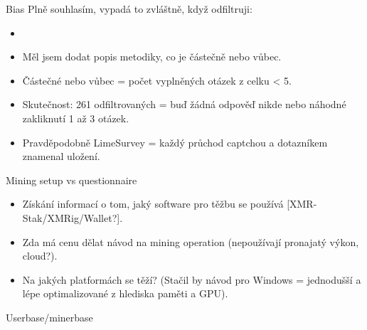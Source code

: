 \documentclass{beamer}
\begin{document}
\begin{darkframes}
\begin{frame}{Bias}
Plně souhlasím, vypadá to zvláštně, když odfiltruji:\begin{itemize}\itemsep0em
\item {} 
\item Měl jsem dodat popis metodiky, co je částečně nebo vůbec.
\end{itemize}
\vspace{0.5em}
\begin{itemize}\itemsep0em
\item Částečné nebo vůbec = počet vyplněných otázek z celku < 5. 
\item Skutečnost: 261 odfiltrovaných = buď žádná odpověď nikde nebo náhodné zakliknutí 1 až 3 otázek.
\item Pravděpodobně  LimeSurvey = každý průchod captchou a dotazníkem znamenal uložení.
\end{itemize}
    \end{frame}
        \begin{frame}{Mining setup vs questionnaire}
     \color{aquamarine}
\vspace{1em}
\begin{itemize}
\item Získání informací o tom, jaký software pro těžbu se používá [XMR-Stak/XMRig/Wallet?].
\item Zda má cenu dělat návod na mining operation (nepoužívají pronajatý výkon, cloud?).
\item Na jakých platformách se těží? (Stačil by návod pro Windows = jednodušší a lépe optimalizované z hlediska paměti a GPU).
\end{itemize}

    \end{frame}

        \begin{frame}{Userbase/minerbase}
     \color{aquamarine}
    \end{frame}
    

\end{darkframes}
\end{document}

